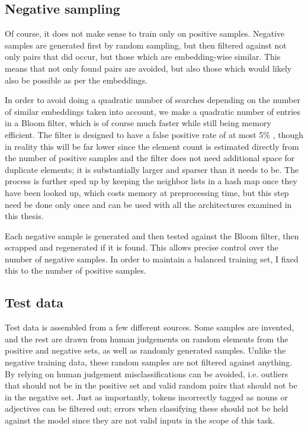 \documentclass[a4paper, 12pt]{article}
\begin{document}
\subsection{Negative sampling}
\label{sec:neg-samp}

Of course, it does not make sense to train only on positive samples. Negative samples are generated first by random sampling, but then filtered against not only pairs that did occur, but those which are embedding-wise similar. This means that not only found pairs are avoided, but also those which would likely also be possible as per the embeddings.

In order to avoid doing a quadratic number of searches depending on the number of similar embeddings taken into account, we make a quadratic number of entries in a Bloom filter, which is of course much faster while still being memory efficient. The filter is designed to have a false positive rate of at most 5\% , though in reality this will be far lower since the element count is estimated directly from the number of positive samples and the filter does not need additional space for duplicate elements; it is substantially larger and sparser than it needs to be. The process is further sped up by keeping the neighbor lists in a hash map once they have been looked up, which costs memory at preprocessing time, but this step need be done only once and can be used with all the architectures examined in this thesis.

Each negative sample is generated and then tested against the Bloom filter, then scrapped and regenerated if it is found. This allows precise control over the number of negative samples. In order to maintain a balanced training set, I fixed this to the number of positive samples.

\subsection{Test data}
\label{sec:test-data}

Test data is assembled from a few different sources. Some samples are invented, and the rest are drawn from human judgements on random elements from the positive and negative sets, as well as randomly generated samples. Unlike the negative training data, these random samples are not filtered against anything. By relying on human judgement misclassifications can be avoided, i.e. outliers that should not be in the positive set and valid random pairs that should not be in the negative set. Just as importantly, tokens incorrectly tagged as nouns or adjectives can be filtered out; errors when classifying these should not be held against the model since they are not valid inputs in the scope of this task.
\end{document}
